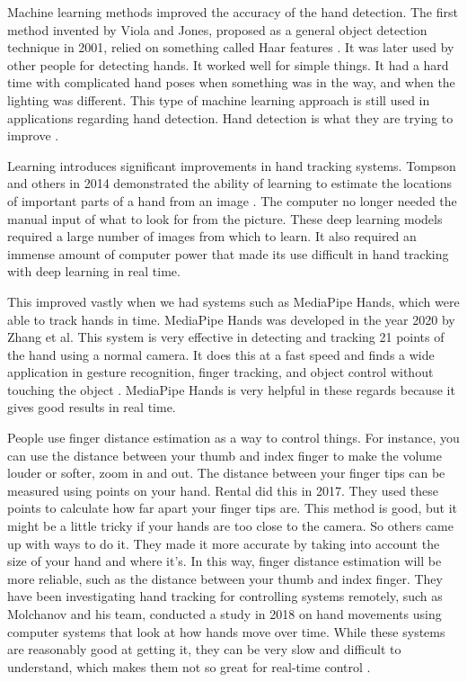 \documentclass[conference]{IEEEtran}
\begin{document}
Machine learning methods improved the accuracy of the hand detection. The first method invented by Viola and Jones, proposed as a general object detection technique in 2001, relied on something called Haar features \cite{ref2}. It was later used by other people for detecting hands. It worked well for simple things. It had a hard time with complicated hand poses when something was in the way, and when the lighting was different. This type of machine learning approach is still used in applications regarding hand detection. Hand detection is what they are trying to improve \cite{ref3}.

Learning introduces significant improvements in hand tracking systems. Tompson and others in 2014 demonstrated the ability of learning to estimate the locations of important parts of a hand from an image \cite{ref4}. The computer no longer needed the manual input of what to look for from the picture. These deep learning models required a large number of images from which to learn. It also required an immense amount of computer power that made its use difficult in hand tracking with deep learning in real time.

This improved vastly when we had systems such as MediaPipe Hands, which were able to track hands in time. MediaPipe Hands was developed in the year 2020 by Zhang et al. This system is very effective in detecting and tracking 21 points of the hand using a normal camera. It does this at a fast speed and finds a wide application in gesture recognition, finger tracking, and object control without touching the object \cite{ref4}. MediaPipe Hands is very helpful in these regards because it gives good results in real time.

People use finger distance estimation as a way to control things. For instance, you can use the distance between your thumb and index finger to make the volume louder or softer, \cite{ref6} zoom in and out. The distance between your finger tips can be measured using points on your hand. Rental did this in 2017. They used these points to calculate how far apart your finger tips are. This method is good, but it might be a little tricky if your hands are too close to the camera. So others came up with ways to do it. They made it more accurate by taking into account the size of your hand and where it's. In this way, finger distance estimation will be more reliable, such as the distance between your thumb and index finger. They have been investigating hand tracking for controlling systems remotely, such as Molchanov and his team, conducted a study in 2018 on hand movements using computer systems \cite{ref1} that look at how hands move over time. While these systems are reasonably good at getting it, they can be very slow and difficult to understand, which makes them not so great for real-time control \cite{ref1}.
\end{document}

